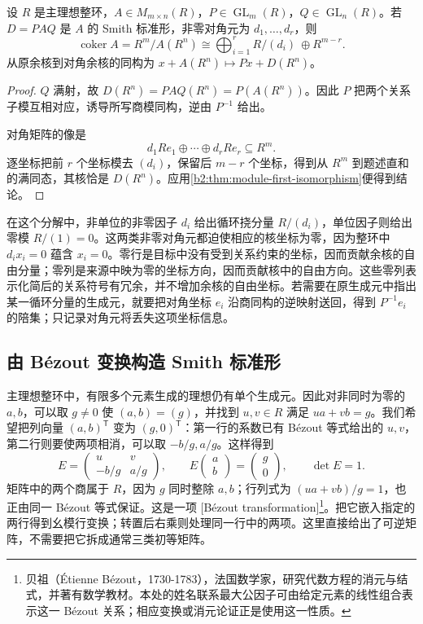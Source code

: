 \begin{proposition}\label{b2:prop:smith-cokernel}
	设 \(R\) 是主理想整环，\(A\in M_{m\times n}(R)\)，\(P\in\operatorname{GL}_m(R)\)，\(Q\in\operatorname{GL}_n(R)\)。若 \(D=PAQ\) 是 \(A\) 的 Smith 标准形，非零对角元为 \(d_1,\ldots,d_r\)，则
	\[
		\operatorname{coker}A=R^m/A(R^n) \cong\bigoplus_{i=1}^r R/(d_i)\ \oplus R^{m-r}.
	\]
	从原余核到对角余核的同构为 \(x+A(R^n)\mapsto Px+D(R^n)\)。
\end{proposition}
\begin{proof}
	\(Q\) 满射，故 \(D(R^n)=PAQ(R^n)=P(A(R^n))\)。因此 \(P\) 把两个关系子模互相对应，诱导所写商模同构，逆由 \(P^{-1}\) 给出。

	对角矩阵的像是
	\[
		d_1Re_1\oplus\cdots\oplus d_rRe_r\subseteq R^m.
	\]
	逐坐标把前 \(r\) 个坐标模去 \((d_i)\)，保留后 \(m-r\) 个坐标，得到从 \(R^m\) 到题述直和的满同态，其核恰是 \(D(R^n)\)。应用\cref{b2:thm:module-first-isomorphism}便得到结论。
\end{proof}

在这个分解中，非单位的非零因子 \(d_i\) 给出循环挠分量 \(R/(d_i)\)，单位因子则给出零模 \(R/(1)=0\)。这两类非零对角元都迫使相应的核坐标为零，因为整环中 \(d_ix_i=0\) 蕴含 \(x_i=0\)。零行是目标中没有受到关系约束的坐标，因而贡献余核的自由分量；零列是来源中映为零的坐标方向，因而贡献核中的自由方向。这些零列表示化简后的关系符号有冗余，并不增加余核的自由坐标。若需要在原生成元中指出某一循环分量的生成元，就要把对角坐标 \(e_i\) 沿商同构的逆映射送回，得到 \(P^{-1}e_i\) 的陪集；只记录对角元将丢失这项坐标信息。

\subsection{由 Bézout 变换构造 Smith 标准形}
\label{b2:subsec:0401:04}

主理想整环中，有限多个元素生成的理想仍有单个生成元。因此对非同时为零的 \(a,b\)，可以取 \(g\ne0\) 使 \((a,b)=(g)\)，并找到 \(u,v\in R\) 满足 \(ua+vb=g\)。我们希望把列向量 \((a,b)^{\mathsf T}\) 变为 \((g,0)^{\mathsf T}\)：第一行的系数已有 Bézout 等式给出的 \(u,v\)，第二行则要使两项相消，可以取 \(-b/g,a/g\)。这样得到
\[
	E=\begin{pmatrix}u&v\\-b/g&a/g\end{pmatrix},
	\qquad
	E\begin{pmatrix}a\\b\end{pmatrix}=\begin{pmatrix}g\\0\end{pmatrix},
	\qquad \det E=1.
\]
矩阵中的两个商属于 \(R\)，因为 \(g\) 同时整除 \(a,b\)；行列式为 \((ua+vb)/g=1\)，也正由同一 Bézout 等式保证。这是一项 [Bézout transformation]\footnote{贝祖（Étienne Bézout，1730-1783），法国数学家，研究代数方程的消元与结式，并著有数学教材。本处的姓名联系最大公因子可由给定元素的线性组合表示这一 Bézout 关系；相应变换或消元论证正是使用这一性质。}。把它嵌入指定的两行得到幺模行变换；转置后右乘则处理同一行中的两项。这里直接给出了可逆矩阵，不需要把它拆成通常三类初等矩阵。

